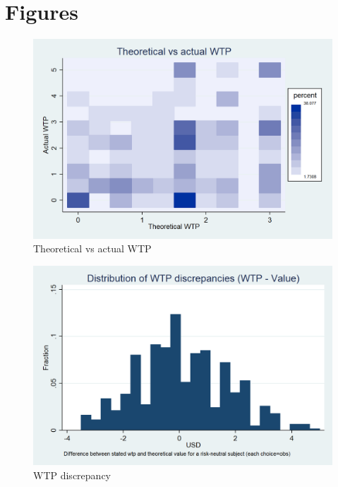\documentclass[12pt,a4paper]{article}
\begin{document}
 \label{het_wtp_tab}




\newpage
\section{Figures}


\begin{figure}[H]
\centering
\caption{Theoretical vs actual WTP}\label{wtp_heat_fig}
\includegraphics[scale=0.3]{Graphs/WTP_value_heat.png}
\end{figure}

\begin{figure}[H]
\centering
\caption{WTP discrepancy} \label{WTP_discrepancy_fig}

  \centering
  \includegraphics[scale=0.3]{Graphs/hist_WTP_discr1.png}

\end{figure}
\end{document}
